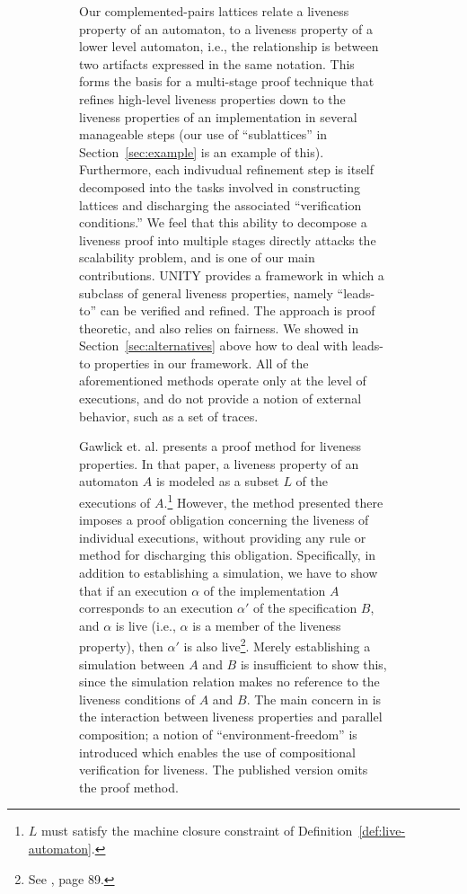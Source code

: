 \documentclass[11pt]{article}
\begin{document}
\begin{figure}[htb]
\begin{figure}[htb]
Our complemented-pairs lattices relate a liveness property of an
automaton, to a liveness property of a lower level automaton, i.e.,
the relationship is between two artifacts expressed in the same
notation. This forms the basis for a multi-stage proof
technique that refines high-level liveness properties down to the
liveness properties of an implementation in several manageable
steps (our use of ``sublattices'' in Section~\ref{sec:example} is an
example of this). Furthermore, each indivudual refinement step is
itself decomposed into the tasks involved in constructing lattices and 
discharging the associated ``verification conditions.''
We feel that this ability to decompose a liveness proof into
multiple stages directly attacks the scalability problem,
and is one of our main contributions.
UNITY \cite{CM88} provides a framework in which a subclass of general
liveness properties, namely ``leads-to'' can be verified and
refined. The approach is proof theoretic, and also relies on
fairness. We showed in Section~\ref{sec:alternatives} above how to
deal with leads-to properties in our framework.
All of the aforementioned methods operate only at the level of
executions, and do not provide a notion of external behavior, such as
a set of traces.




Gawlick et. al. \cite{GSSL93,GSSL98} presents a proof method
for liveness properties.  In that paper, a
liveness property of an automaton $A$ is modeled as a subset $L$ of
the executions of $A$.\footnote{$L$ must satisfy the machine closure
constraint of Definition~\ref{def:live-automaton}.}
However, the method presented there imposes a proof obligation
concerning the liveness of individual executions, without providing
any rule or method for discharging this obligation. Specifically, 
in addition to establishing a simulation, we have to
show that if an execution $\alpha$ of the implementation $A$
corresponds to an execution $\alpha'$ of the specification $B$,
and $\alpha$ is live (i.e., $\alpha$ is a member of the liveness
property), then $\alpha'$ is also live\footnote{See \cite{GSSL93}, page 89.}.
Merely establishing a simulation between $A$ and $B$
is insufficient to show this, since the simulation relation makes no
reference to the liveness conditions of $A$ and $B$.
The main concern in \cite{GSSL93} is the interaction between
liveness properties and parallel composition; a
notion of ``environment-freedom'' is introduced which 
enables the use of compositional verification for liveness.
The published version \cite{GSSL98} omits the proof method.


\end{figure}
\end{figure}
\end{document}
